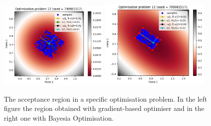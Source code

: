 
\begin{figure}[H]
    \begin{center}
      \includegraphics[width=0.48\textwidth]{./latex_files/images/chapter4/ma2_region_3.png}
      \includegraphics[width=0.48\textwidth]{./latex_files/images/chapter4/ma2_region_3_bo.png}
    \end{center}
  \caption[The acceptance region of a specific deterministic simulator.]{The acceptance region in a specific optimisation problem. In the left figure the region obtained with gradient-based optimiser and in the right one with Bayesia Optimisation.}
  \label{fig:ma2_5}
\end{figure}



